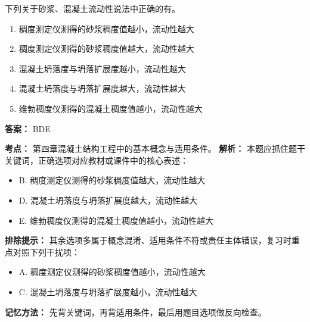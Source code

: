 \documentclass[UTF8,fontset=fandol,11pt]{ctexart}
\begin{document}
\begin{quizbox}[title={第 55 题}]
下列关于砂浆、混凝土流动性说法中正确的有。\\
\begin{enumerate}[label=\Alph*.]
\item 稠度测定仪测得的砂浆稠度值越小，流动性越大
\item 稠度测定仪测得的砂浆稠度值越大，流动性越大
\item 混凝土坍落度与坍落扩展度越小，流动性越大
\item 混凝土坍落度与坍落扩展度越大，流动性越大
\item 维勃稠度仪测得的混凝土稠度值越小，流动性越大
\end{enumerate}
\textbf{答案：} BDE
\vspace{0.25em}
\begin{answerbox}[title={考点解析}]
\textbf{考点：} 第四章混凝土结构工程中的基本概念与适用条件。
\textbf{解析：} 本题应抓住题干关键词，正确选项对应教材或课件中的核心表述：
\begin{itemize}
\item B. 稠度测定仪测得的砂浆稠度值越大，流动性越大
\item D. 混凝土坍落度与坍落扩展度越大，流动性越大
\item E. 维勃稠度仪测得的混凝土稠度值越小，流动性越大
\end{itemize}
\textbf{排除提示：} 其余选项多属于概念混淆、适用条件不符或责任主体错误，复习时重点对照下列干扰项：
\begin{itemize}
\item A. 稠度测定仪测得的砂浆稠度值越小，流动性越大
\item C. 混凝土坍落度与坍落扩展度越小，流动性越大
\end{itemize}
\textbf{记忆方法：} 先背关键词，再背适用条件，最后用题目选项做反向检查。
\end{answerbox}
\end{quizbox}
\end{document}
